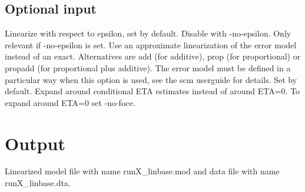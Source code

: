 \subsection{Optional input}
\begin{optionlist}
Linearize with respect to epsilon, set by default. Disable with -no-epsilon.
\nextopt
{}
Only relevant if -no-epsilon is set. 
Use an approximate linearization of the error model instead of an exact.
Alternatives are add (for additive), prop (for proportional) or
propadd (for proportional plus additive).
The error model must be defined in a particular way when this option is used,
see the scm userguide for details.
\nextopt
{}
Set by default. Expand around conditional ETA estimates instead of around ETA=0. To expand around ETA=0 set -no-foce.
\nextopt
\end{optionlist}

\section{Output}
Linearized model file with name runX\_linbase.mod and data file with name runX\_linbase.dta.


